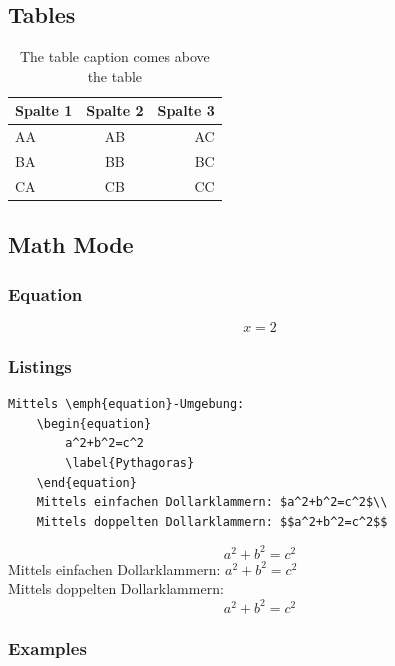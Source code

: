 \documentclass{scrartcl}
\begin{document}
\subsection{Tables}

\begin{table}[ht]
	\begin{center}
		\caption{The table caption comes above the table}
		\begin{tabular}{l|cr}
			\toprule
			Spalte 1 & Spalte 2 & Spalte 3\\
			\midrule
			AA & AB & AC\\
			BA & BB & BC\\
			CA & CB & CC\\
			\bottomrule
		\end{tabular}
	\end{center}
\end{table}

\subsection{Math Mode}

\subsubsection{Equation}
\begin{equation}
	x=2
	\label{eq:x_is_two}
\end{equation}

\subsubsection{Listings}
\begin{lstlisting}[caption = Wege in den Mathematikmodus, label = ReininMathe]
	Mittels \emph{equation}-Umgebung:
	\begin{equation}
		a^2+b^2=c^2
		\label{Pythagoras}
	\end{equation}
	Mittels einfachen Dollarklammern: $a^2+b^2=c^2$\\
	Mittels doppelten Dollarklammern: $$a^2+b^2=c^2$$
\end{lstlisting}


	\begin{equation}
	a^2+b^2=c^2
	\label{Pythagoras}
\end{equation}
Mittels einfachen Dollarklammern: $a^2+b^2=c^2$\\
Mittels doppelten Dollarklammern: $$a^2+b^2=c^2$$

\subsubsection{Examples}
\end{document}
